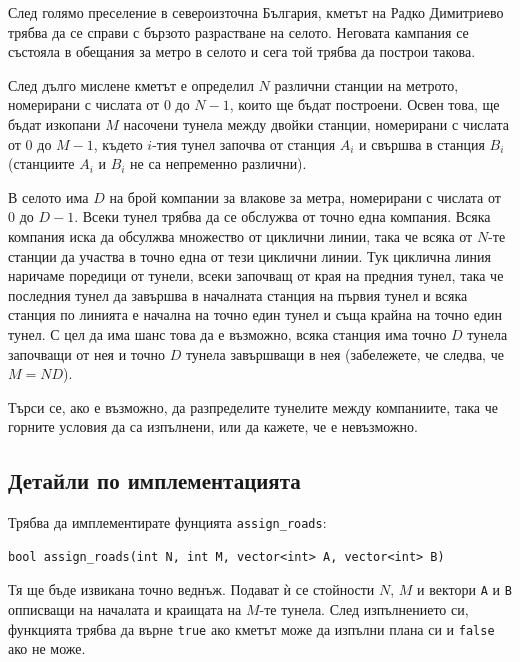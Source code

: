 \documentclass[12pt]{article}
\begin{document}
\renewcommand{\tl}{5 сек.}
\renewcommand{\ml}{1024 MB}
\renewcommand{\header}{
    НАЦИОНАЛЕН ЛЕТЕН ТУРНИР ПО ИНФОРМАТИКА\\
    Пловдив, 6-8 юни 2025 г.\\
    Група A, 11-12 клас
}

След голямо преселение в североизточна България, кметът на Радко Димитриево трябва да се справи с бързото разрастване на селото.
Неговата кампания се състояла в обещания за метро в селото и сега той трябва да построи такова.

След дълго мислене кметът е определил $N$ различни станции на метрото, номерирани с числата от $0$ до $N-1$, които ще бъдат построени. Освен това, ще бъдат изкопани $M$ насочени тунела между двойки станции, номерирани с числата от $0$ до $M-1$, където $i$-тия тунел започва от станция $A_i$ и свършва в станция $B_i$ (станциите $A_i$ и $B_i$ не са непременно различни).

В селото има $D$ на брой компании за влакове за метра, номерирани с числата от $0$ до $D-1$. Всеки тунел трябва да се обслужва от точно една компания. Всяка компания иска да обсулжва множество от циклични линии, така че всяка от $N$-те станции да участва в точно една от тези циклични линии. Тук циклична линия наричаме поредици от тунели, всеки започващ от края на предния тунел, така че последния тунел да завършва в началната станция на първия тунел и всяка станция по линията е начална на точно един тунел и съща крайна на точно един тунел. С цел да има шанс това да е възможно, всяка станция има точно $D$ тунела започващи от нея и точно $D$ тунела завършващи в нея (забележете, че следва, че $M = ND$).

Търси се, ако е възможно, да разпределите тунелите между компаниите, така че горните условия да са изпълнени, или да кажете, че е невъзможно. 

\subsection{Детайли по имплементацията}

Трябва да имплементирате фунцията \verb|assign_roads|:

\begin{verbatim}
bool assign_roads(int N, int M, vector<int> A, vector<int> B)
\end{verbatim}

Тя ще бъде извикана точно веднъж.
Подават ѝ се стойности $N$, $M$ и вектори \verb|A| и \verb|B| опписващи на началата и краищата на $M$-те тунела.
След изпълнението си, функцията трябва да върне \verb|true| ако кметът може да изпълни плана си и \verb|false| ако не може.
\end{document}
